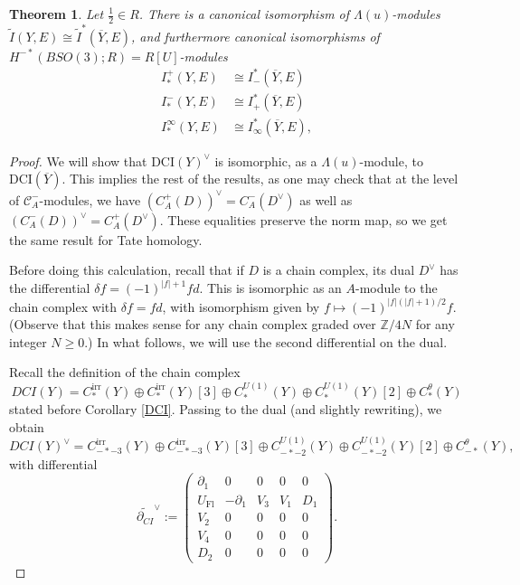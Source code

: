 \documentclass{memo-l}
\newtheorem{theorem}{Theorem}[chapter]
\theoremstyle{definition}
\theoremstyle{remark}
\numberwithin{section}{chapter}
\numberwithin{equation}{chapter}
\begin{document}
\begin{theorem}Let $\frac 12 \in R$. There is a canonical isomorphism of $\Lambda(u)$-modules $\widetilde I(Y, E) \cong \widetilde I^*(\overline Y, E)$, and furthermore canonical isomorphisms of\newline $H^{-*}(BSO(3);R) = R[U]$-modules
\begin{align*}I^+_*(Y,E) &\cong I_-^*(\overline Y,E)\\
I^-_*(Y,E) &\cong I_+^*(\overline Y,E)\\
I^\infty_*(Y,E) &\cong I_\infty^*(\overline Y,E),\end{align*}
\end{theorem}
\begin{proof}We will show that $\text{DCI}(Y)^\vee$ is isomorphic, as a $\Lambda(u)$-module, to $\text{DCI}(\overline Y)$. This implies the rest of the results, as one may check that at the level of $\mathcal C^-_A$-modules, we have $\left(C^+_A(D)\right)^\vee = C^-_A(D^\vee)$ as well as $\left(C^-_A(D)\right)^\vee = C^+_A(D^\vee)$. These equalities preserve the norm map, so we get the same result for Tate homology.

Before doing this calculation, recall that if $D$ is a chain complex, its dual $D^\vee$ has the differential $\delta f = (-1)^{|f|+1} fd$. This is isomorphic as an $A$-module to the chain complex with $\delta f = f d$, with isomorphism given by $f \mapsto (-1)^{|f|(|f|+1)/2} f$. (Observe that this makes sense for any chain complex graded over $\mathbb Z/4N$ for any integer $N \geq 0$.) In what follows, we will use the second differential on the dual.

Recall the definition of the chain complex $$DCI(Y) = C_*^{\text{irr}}(Y) \oplus C_*^{\text{irr}}(Y)[3] \oplus C_*^{U(1)}(Y) \oplus C_*^{U(1)}(Y)[2] \oplus C_*^\theta(Y)$$ stated before Corollary \ref{DCI}. Passing to the dual (and slightly rewriting), we obtain $$DCI(Y)^\vee = C_{-*-3}^{\text{irr}}(Y) \oplus C_{-*-3}^{\text{irr}}(Y)[3] \oplus C_{-*-2}^{U(1)}(Y) \oplus C_{-*-2}^{U(1)}(Y)[2] \oplus C_{-*}^\theta(Y),$$ with differential $$\widetilde{\partial_{CI}}^\vee := \begin{pmatrix}\partial_1 & 0 & 0 & 0 & 0\\U_{\text{Fl}} & -\partial_1 & V_3 & V_1 & D_1 \\ V_2 & 0 & 0 & 0 & 0\\ V_4 & 0 & 0 & 0 & 0\\ D_2 & 0 & 0 & 0 & 0\end{pmatrix}.$$


\end{proof}
\end{document}
